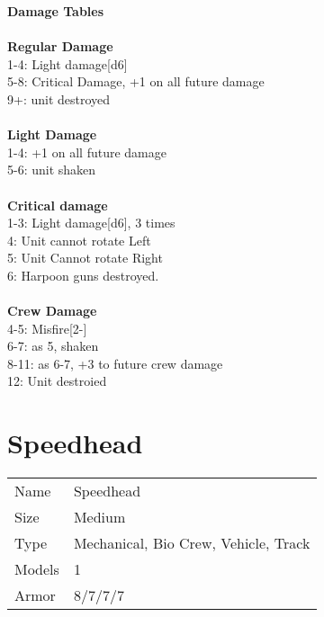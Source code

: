{\bf Damage Tables} \\
\ \\ {\bf Regular Damage } \\
1-4: Light damage[d6] \\
5-8: Critical Damage, +1 on all future damage \\
9+: unit destroyed \\
\ \\ {\bf Light Damage } \\
1-4: +1 on all future damage \\
5-6: unit shaken \\
\ \\ {\bf Critical damage } \\
1-3: Light damage[d6], 3 times \\
4: Unit cannot rotate Left \\
5: Unit Cannot rotate Right \\
6: Harpoon guns destroyed. \\
\ \\ {\bf Crew Damage } \\
4-5: Misfire[2-] \\
6-7: as 5, shaken \\
8-11: as 6-7, +3 to future crew damage \\
12: Unit destroied \\










\pagebreak

\section{ Speedhead }

\begin{tabular}{ll}
  Name & Speedhead \\
  Size & Medium\\
  Type & Mechanical, Bio Crew, Vehicle, Track\\
  Models & 1\\
  Armor & 8/7/7/7\\
\end{tabular}



